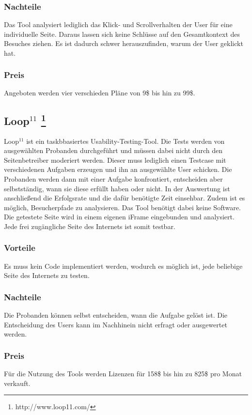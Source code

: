 \subsubsection*{Nachteile}
Das Tool analysiert lediglich das Klick- und Scrollverhalten der User für eine individuelle Seite. Daraus lassen sich keine Schlüsse auf den Gesamtkontext des Besuches ziehen. Es ist dadurch schwer herauszufinden, warum der User geklickt hat.

\subsubsection*{Preis}
Angeboten werden vier verschieden Pläne von 9\$ bis hin zu 99\$.

\subsection*{Loop$^{11}$ \footnote{http://www.loop11.com/}}

Loop$^{11}$ ist ein taskbbasiertes Usability-Testing-Tool. Die Tests werden von ausgewählten Probanden durchgeführt und müssen dabei nicht durch den Seitenbetreiber moderiert werden. Dieser muss lediglich einen Testcase mit verschiedenen Aufgaben erzeugen und ihn an ausgewählte User schicken. Die Probanden werden dann mit einer Aufgabe konfrontiert, entscheiden aber selbstständig, wann sie diese erfüllt haben oder nicht. In der Auswertung ist anschließend die Erfolgsrate und die dafür benötigte Zeit einsehbar. Zudem ist es möglich, Besucherpfade zu analysieren. Das Tool benötigt dabei keine Software. Die getestete Seite wird in einem eigenen iFrame eingebunden und analysiert. Jede frei zugängliche Seite des Internets ist somit testbar.

\subsubsection*{Vorteile}
Es muss kein Code implementiert werden, wodurch es möglich ist, jede beliebige Seite des Internets zu testen.

\subsubsection*{Nachteile}
Die Probanden können selbst entscheiden, wann die Aufgabe gelöst ist. Die Entscheidung des Users kann im Nachhinein nicht erfragt oder ausgewertet werden.

\subsubsection*{Preis}
Für die Nutzung des Tools werden Lizenzen für 158\$ bis hin zu 825\$ pro Monat verkauft.

